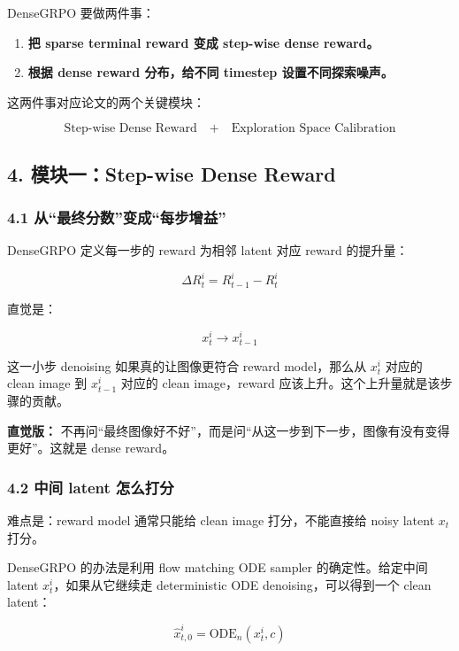 DenseGRPO 要做两件事：

\begin{enumerate}[leftmargin=1.5em]
  \item \textbf{把 sparse terminal reward 变成 step-wise dense reward。}
  \item \textbf{根据 dense reward 分布，给不同 timestep 设置不同探索噪声。}
\end{enumerate}

这两件事对应论文的两个关键模块：

\[
\text{Step-wise Dense Reward}
\quad + \quad
\text{Exploration Space Calibration}
\]

\subsection{4. 模块一：Step-wise Dense Reward}

\subsubsection{4.1 从“最终分数”变成“每步增益”}

DenseGRPO 定义每一步的 reward 为相邻 latent 对应 reward 的提升量：

\[
\Delta R^i_t
=
R^i_{t-1} - R^i_t
\]

直觉是：

\[
x^i_t \rightarrow x^i_{t-1}
\]

这一小步 denoising 如果真的让图像更符合 reward model，那么从 \(x^i_t\) 对应的 clean image 到 \(x^i_{t-1}\) 对应的 clean image，reward 应该上升。这个上升量就是该步骤的贡献。

\begin{intubox}
\textbf{直觉版：} 不再问“最终图像好不好”，而是问“从这一步到下一步，图像有没有变得更好”。这就是 dense reward。
\end{intubox}

\subsubsection{4.2 中间 latent 怎么打分}

难点是：reward model 通常只能给 clean image 打分，不能直接给 noisy latent \(x_t\) 打分。

DenseGRPO 的办法是利用 flow matching ODE sampler 的确定性。给定中间 latent \(x^i_t\)，如果从它继续走 deterministic ODE denoising，可以得到一个 clean latent：

\[
\hat{x}^i_{t,0}
=
\mathrm{ODE}_n(x^i_t, c)
\]


